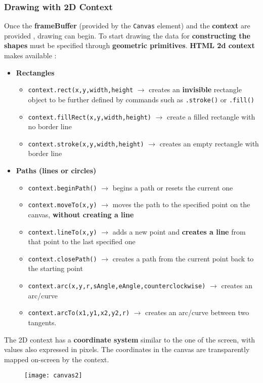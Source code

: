 \subsubsection{Drawing with 2D Context}
Once the \textbf{frameBuffer} (provided by the \texttt{Canvas} element) and the \textbf{context} are provided , drawing can begin. To start drawing the data for \textbf{constructing the shapes} must be specified through \textbf{geometric primitives}. \textbf{HTML 2d context} makes available :
\begin{itemize}
\item \textbf{Rectangles}
\begin{itemize}
\item \texttt{context.rect(x,y,width,height} $\to$ creates an \textbf{invisible} rectangle object to be further defined by commands such as \texttt{.stroke()} or \texttt{.fill()}
\item \texttt{context.fillRect(x,y,width,height)} $\to$ create a filled rectangle with no border line
\item \texttt{context.stroke(x,y,width,height)} $\to$ creates an empty rectangle with border line

\end{itemize}
\item \textbf{Paths (lines or circles)}
\begin{itemize}
\item \texttt{context.beginPath()} $\to$ begins a path or resets the current one
\item \texttt{context.moveTo(x,y)} $\to$ moves the path to the specified point on the canvas, \textbf{without creating a line}
\item \texttt{context.lineTo(x,y)} $\to$ adds a new point and \textbf{creates a line} from that point to the last specified one
\item \texttt{context.closePath()} $\to$ creates a path from the current point back to the starting point
\item \texttt{context.arc(x,y,r,sAngle,eAngle,counterclockwise)} $\to$ creates an arc/curve 
\item \texttt{context.arcTo(x1,y1,x2,y2,r)} $\to$ creates an arc/curve between two tangents.
\end{itemize}
\end{itemize}
The 2D context has a \textbf{coordinate system} similar to the one of the screen, with values also expressed in pixels. The coordinates in the canvas are transparently mapped on-screen by the context.
  \begin{figure}[H]
 \centering
 \texttt{[image: canvas2]} 
 \end{figure}

